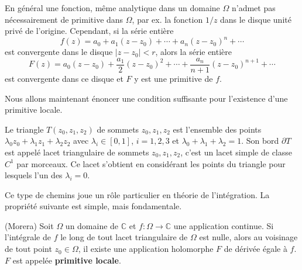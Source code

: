 En général une fonction, même analytique dans un domaine $\Omega$ n'admet pas nécessairement de primitive dans $\Omega$, par ex. la fonction $1/z$ dans le disque unité privé de l'origine. Cependant, si la série entière 
\[f(z)=a_0 + a_1 (z-z_0) +\cdots + a_n (z-z_0)^n + \cdots\]
est convergente dans le disque $\lvert z-z_0 \rvert <r$, alors la série entière
\[F(z)=a_0 (z-z_0) + \frac{a_1}{2} (z-z_0)^2 +\cdots + \frac{a_n}{n+1} (z-z_0)^{n+1} + \cdots\]
est convergente dans ce disque et $F$ y est une primitive de $f$.

Nous allons maintenant énoncer une condition suffisante pour l'existence d'une primitive locale. 

\begin{fdefn}
Le triangle $T(z_0,z_1, z_2)$ de sommets $z_0,z_1,z_2$ est l'ensemble des points $\lambda_0 z_0 + \lambda_1 z_1 + \lambda_2 z_2$ avec $\lambda_i \in [0,1]$, $i=1,2,3$ et $\lambda_0 + \lambda_1 + \lambda_2 =1$. Son bord $\partial T$ est appelé lacet triangulaire de sommets $z_0,z_1,z_2$, c'est un lacet simple de
classe $C^1$ par morceaux. Ce lacet s'obtient en considérant les points du triangle pour lesquels l'un des $\lambda_i=0$.
\end{fdefn}

Ce type de chemins joue un rôle particulier en théorie de l'intégration. La
propriété suivante est simple, mais fondamentale.

\begin{fthm}(Morera)
Soit $\Omega$ un domaine de $\mathbb{C}$ et $f \colon \Omega \to \mathbb{C}$ une
application continue. Si l'intégrale de $f$ le long de tout lacet triangulaire
de $\Omega$ est nulle, alors au voisinage de tout point $z_0 \in \Omega$, il
existe une application holomorphe $F$ de dérivée égale à $f$. $F$ est appelée \textbf{primitive locale}.
\end{fthm}

